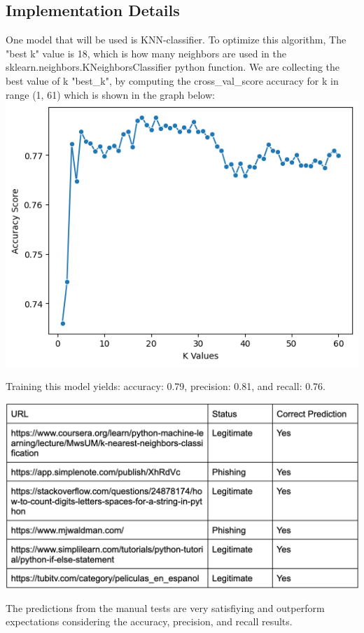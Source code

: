 \documentclass[conference]{IEEEtran}
\begin{document}
\subsection{Implementation Details}
One model that will be used is KNN-classifier. To optimize this algorithm, The "best k" value is 18, which is how many neighbors are used in the sklearn.neighbors.KNeighborsClassifier python function. We are collecting the best value of k "best_k", by computing the cross_val_score accuracy for k in range (1, 61) which is shown in the graph below:
\includegraphics{best-k-value.png}

Training this model yields: accuracy: 0.79, precision: 0.81, and recall: 0.76.

\includegraphics{knnManualTest.png}

The predictions from the manual tests are very satisfiying and outperform expectations considering the accuracy, precision, and recall results. 
\end{document}
